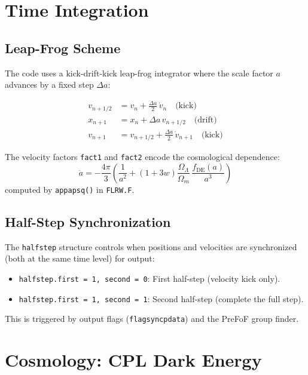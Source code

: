 \documentclass[11pt,fleqn]{book}
\newcommand{\code}[1]{\texttt{#1}}
\newcommand{\file}[1]{\texttt{#1}}
\begin{document}
\chapter{Time Integration}
\label{ch:timeint}

\section{Leap-Frog Scheme}

The code uses a kick-drift-kick leap-frog integrator where the scale factor $a$ advances by a fixed step $\Delta a$:

\begin{align}
  v_{n+1/2} &= v_n + \frac{\Delta a}{2}\,\dot{v}_n \quad \text{(kick)} \\
  x_{n+1} &= x_n + \Delta a\,v_{n+1/2} \quad \text{(drift)} \\
  v_{n+1} &= v_{n+1/2} + \frac{\Delta a}{2}\,\dot{v}_{n+1} \quad \text{(kick)}
\end{align}

The velocity factors \code{fact1} and \code{fact2} encode the cosmological dependence:
\begin{equation}
  \ddot{a} = -\frac{4\pi}{3}\left(\frac{1}{a^2} + (1+3w)\frac{\Omega_\Lambda}{\Omega_m}\,\frac{f_\text{DE}(a)}{a^3}\right)
\end{equation}
computed by \code{appapsq()} in \file{FLRW.F}.

\section{Half-Step Synchronization}

The \code{halfstep} structure controls when positions and velocities are synchronized (both at the same time level) for output:
\begin{itemize}[leftmargin=2em]
  \item \code{halfstep.first = 1, second = 0}: First half-step (velocity kick only).
  \item \code{halfstep.first = 1, second = 1}: Second half-step (complete the full step).
\end{itemize}

This is triggered by output flags (\code{flagsyncpdata}) and the PreFoF group finder.


\chapter{Cosmology: CPL Dark Energy}
\label{ch:cpl}
\end{document}
